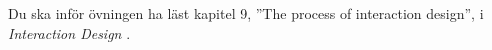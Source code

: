 Du ska inför övningen ha läst kapitel 9, ''\foreignlanguage{english}{The 
process of interaction design}'', i \emph{Interaction Design} 
\citep{Sharp2011idb}.
